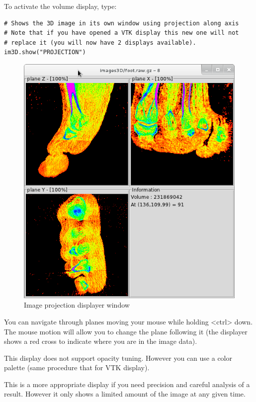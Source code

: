 \documentclass[a4paper,10pt,oneside]{article}
\begin{document}
To activate the volume display, type:

\lstset{language=Python}
\begin{lstlisting}
# Shows the 3D image in its own window using projection along axis
# Note that if you have opened a VTK display this new one will not
# replace it (you will now have 2 displays available).
im3D.show("PROJECTION")
\end{lstlisting}

\begin{figure}
\centering
\includegraphics[scale=0.5]{images/display_proj.png}
\caption{Image projection displayer window}
\label{fig:dis3D_proj}
\end{figure}

You can navigate through planes moving your mouse while holding <ctrl> down.
The mouse motion will allow you to change the plane following it (the displayer
shows a red cross to indicate where you are in the image data).

This display does not support opacity tuning. However you can use a color
palette (same procedure that for VTK display).

This is a more appropriate display if you need precision and careful
analysis of a result. However it only shows a limited amount of the
image at any given time.
\end{document}
